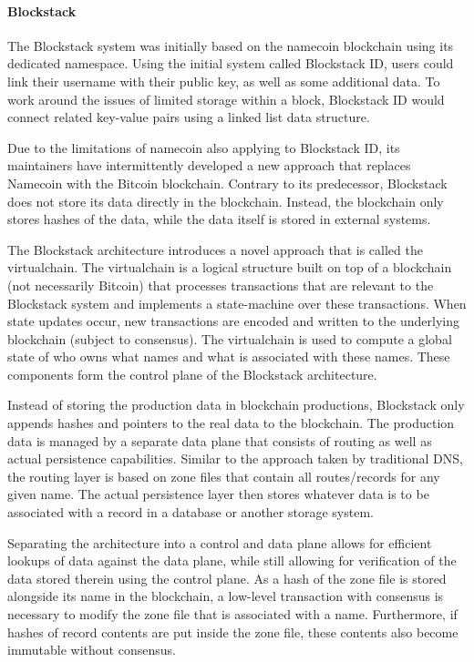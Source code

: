 \paragraph{Blockstack}

The Blockstack system was initially based on the namecoin blockchain using its dedicated namespace. Using the initial system called Blockstack ID, users could link their username with their public key, as well as some additional data. To work around the issues of limited storage within a block, Blockstack ID would connect related key-value pairs using a linked list data structure.

Due to the limitations of namecoin also applying to Blockstack ID, its maintainers have intermittently developed a new approach that replaces Namecoin with the Bitcoin blockchain. Contrary to its predecessor, Blockstack does not store its data directly in the blockchain. Instead, the blockchain only stores hashes of the data, while the data itself is stored in external systems.

The Blockstack architecture introduces a novel approach that is called the virtualchain. The virtualchain is a logical structure built on top of a blockchain (not necessarily Bitcoin) that processes transactions that are relevant to the Blockstack system and implements a state-machine over these transactions. When state updates occur, new transactions are encoded and written to the underlying blockchain (subject to consensus). The virtualchain is used to compute a global state of who owns what names and what is associated with these names. These components form the control plane of the Blockstack architecture.

Instead of storing the production data in blockchain productions, Blockstack only appends hashes and pointers to the real data to the blockchain. The production data is managed by a separate data plane that consists of routing as well as actual persistence capabilities. Similar to the approach taken by traditional DNS, the routing layer is based on zone files that contain all routes/records for any given name. The actual persistence layer then stores whatever data is to be associated with a record in a database or another storage system.

Separating the architecture into a control and data plane allows for efficient lookups of data against the data plane, while still allowing for verification of the data stored therein using the control plane. As a hash of the zone file is stored alongside its name in the blockchain, a low-level transaction with consensus is necessary to modify the zone file that is associated with a name. Furthermore, if hashes of record contents are put inside the zone file, these contents also become immutable without consensus.

